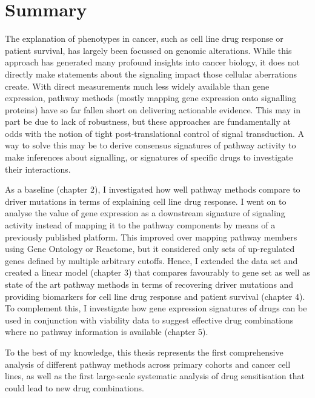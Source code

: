 \chapter*{Summary}
The explanation of phenotypes in cancer, such as cell line drug response or
patient survival, has largely been focussed on genomic alterations. While this
approach has generated many profound insights into cancer biology, it does not
directly make statements about the signaling impact those cellular aberrations
create. With direct measurements much less widely available than gene
expression, pathway methods (mostly mapping gene expression onto signalling
proteins) have so far fallen short on delivering actionable evidence. This may
in part be due to lack of robustness, but these approaches are fundamentally at
odds with the notion of tight post-translational control of signal
transduction. A way to solve this may be to derive consensus signatures of
pathway activity to make inferences about signalling, or signatures of specific
drugs to investigate their interactions.

As a baseline (chapter 2), I investigated how well pathway methods compare to
driver mutations in terms of explaining cell line drug response. I went on to
analyse the value of gene expression as a downstream signature of signaling
activity instead of mapping it to the pathway components by means of a
previously published platform. This improved over mapping pathway members using
Gene Ontology or Reactome, but it considered only sets of up-regulated genes
defined by multiple arbitrary cutoffs.  Hence, I extended the data set and
created a linear model (chapter 3) that compares favourably to gene set as well
as state of the art pathway methods in terms of recovering driver mutations
and providing biomarkers for cell line drug response and patient survival
(chapter 4). To complement this, I investigate how gene expression signatures
of drugs can be used in conjunction with viability data to suggest effective
drug combinations where no pathway information is available (chapter 5).

To the best of my knowledge, this thesis represents the first comprehensive
analysis of different pathway methods across primary cohorts and cancer cell
lines, as well as the first large-scale systematic analysis of drug
sensitisation that could lead to new drug combinations.
